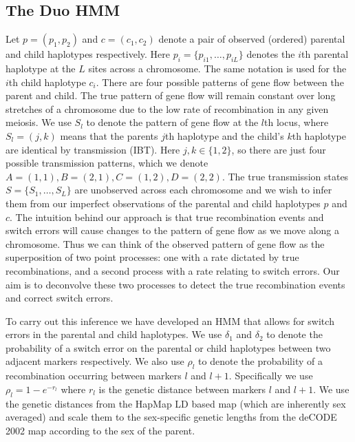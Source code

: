 \subsection{The Duo HMM}
Let $p = (p_1, p_2)$ and $c = (c_1, c_2)$ denote a pair of observed (ordered) parental and child haplotypes respectively. Here $p_i = \{p_{i1},\ldots, p_{iL}\}$ denotes the $i$th parental haplotype at the $L$ sites across a chromosome. The same notation is used for the $i$th child haplotype $c_i$. There are four possible patterns of gene flow between the parent and child. The true pattern of gene flow will remain constant over long stretches of a chromosome due to the low rate of recombination in any given meiosis. We use $S_l$ to denote the pattern of gene flow at the $l$th locus, where $S_l = (j,k)$ means that the parents $j$th haplotype and the child's $k$th haplotype are identical by transmission (IBT). Here $j,k \in \{1,2\}$, so there are just four possible transmission patterns, which we denote $A=(1,1), B=(2,1), C=(1,2), D=(2,2)$. The true transmission states $S=\{S_1, \ldots,S_L\}$ are unobserved across each chromosome and we wish to infer them from our imperfect observations of the parental and child haplotypes $p$ and $c$. The intuition behind our approach is that true recombination events and switch errors will cause changes to the pattern of gene flow as we move along a chromosome. Thus we can think of the observed pattern of gene flow as the superposition of two point processes: one with a rate dictated by true recombinations, and a second process with a rate relating to switch errors. Our aim is to deconvolve these two processes to detect the true recombination events and correct switch errors. 

To carry out this inference we have developed an HMM that allows for switch errors in the parental and child haplotypes. We use $\delta_1$ and $\delta_2$ to denote the probability of a switch error on the parental or child haplotypes between two adjacent markers respectively. We also use  $\rho_l$ to denote the probability of a recombination occurring between markers $l$ and $l+1$. Specifically we use $\rho_l = 1 - e^{-r_l}$ where  $r_l$ is the genetic distance between markers $l$ and $l+1$.  We use the genetic distances from the HapMap LD based map \citep{InternationalHapMapConsortium:2005cu} (which are inherently sex averaged) and scale them to the sex-specific genetic lengths from the deCODE 2002 map \citep{kong2002} according to the sex of the parent.

